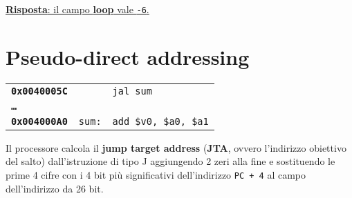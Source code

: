 \documentclass[../main.tex]{subfiles}
\begin{document}
\begin{table}[h!]
        \vspace*{3mm}

        \begin{minipage}{.03\linewidth}
            \hspace*{0cm}
        \end{minipage}
        \begin{minipage}{.94\linewidth}
            \underline{\textbf{Risposta}: il campo {\color{blue} \textbf{loop}} vale \texttt{-6}.}
        \end{minipage}
    \end{table}

    \newpage

    \section{Pseudo-direct addressing}

    \begin{table}[h!]
        \begin{minipage}{.03\linewidth}
            \hspace*{0cm}
        \end{minipage}
        \begin{minipage}{.97\linewidth}
            \begin{tabular}{ l l l }
                \textbf{\texttt{0x0040005C}} & & \texttt{jal sum} \\
                \textbf{\texttt{\dots}} & & \\
                \textbf{\texttt{0x004000A0}} & \texttt{sum:} & \texttt{add \$v0, \$a0, \$a1} \\
            \end{tabular}
        \end{minipage}
    \end{table}

    \noindent
    Il processore calcola il \textbf{jump target address}
    (\textbf{JTA}, ovvero l’indirizzo obiettivo del salto)
    dall'istruzione di tipo J aggiungendo 2 zeri alla fine
    e sostituendo le prime 4 cifre con i 4 bit più significativi
    dell'indirizzo \texttt{PC + 4} al campo dell'indirizzo da 26 bit.
    
\end{document}
